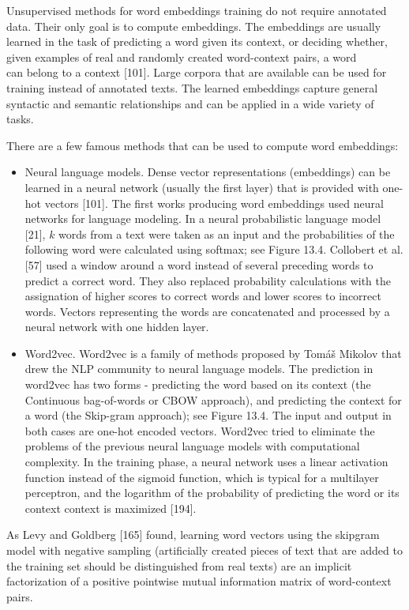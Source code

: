 \documentclass[10pt]{book}
\begin{document}
Unsupervised methods for word embeddings training do not require annotated data. Their only goal is to compute embeddings. The embeddings are usually learned in the task of predicting a word given its context, or deciding whether, given examples of real and randomly created word-context pairs, a word\\[0pt]
can belong to a context [101]. Large corpora that are available can be used for training instead of annotated texts. The learned embeddings capture general syntactic and semantic relationships and can be applied in a wide variety of tasks.

There are a few famous methods that can be used to compute word embeddings:

\begin{itemize}
  \item Neural language models. Dense vector representations (embeddings) can be learned in a neural network (usually the first layer) that is provided with one-hot vectors [101]. The first works producing word embeddings used neural networks for language modeling. In a neural probabilistic language model [21], $k$ words from a text were taken as an input and the probabilities of the following word were calculated using softmax; see Figure 13.4. Collobert et al. [57] used a window around a word instead of several preceding words to predict a correct word. They also replaced probability calculations with the assignation of higher scores to correct words and lower scores to incorrect words. Vectors representing the words are concatenated and processed by a neural network with one hidden layer.
  \item Word2vec. Word2vec is a family of methods proposed by Tomáš Mikolov that drew the NLP community to neural language models. The prediction in word2vec has two forms - predicting the word based on its context (the Continuous bag-of-words or CBOW approach), and predicting the context for a word (the Skip-gram approach); see Figure 13.4. The input and output in both cases are one-hot encoded vectors. Word2vec tried to eliminate the problems of the previous neural language models with computational complexity. In the training phase, a neural network uses a linear activation function instead of the sigmoid function, which is typical for a multilayer perceptron, and the logarithm of the probability of predicting the word or its context context is maximized [194].
\end{itemize}

As Levy and Goldberg [165] found, learning word vectors using the skipgram model with negative sampling (artificially created pieces of text that are added to the training set should be distinguished from real texts) are an implicit factorization of a positive pointwise mutual information matrix of word-context pairs.
\end{document}
